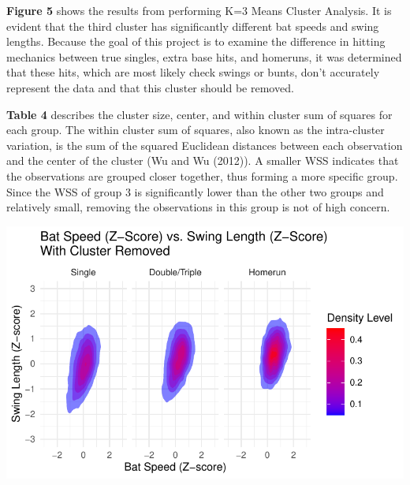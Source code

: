 \documentclass[
  letterpaper,
  DIV=11,
  numbers=noendperiod]{scrartcl}
\begin{document}
\textbf{Figure 5} shows the results from performing K=3 Means Cluster
Analysis. It is evident that the third cluster has significantly
different bat speeds and swing lengths. Because the goal of this project
is to examine the difference in hitting mechanics between true singles,
extra base hits, and homeruns, it was determined that these hits, which
are most likely check swings or bunts, don't accurately represent the
data and that this cluster should be removed.

\textbf{Table 4} describes the cluster size, center, and within cluster
sum of squares for each group. The within cluster sum of squares, also
known as the intra-cluster variation, is the sum of the squared
Euclidean distances between each observation and the center of the
cluster (Wu and Wu (2012)). A smaller WSS indicates that the
observations are grouped closer together, thus forming a more specific
group. Since the WSS of group 3 is significantly lower than the other
two groups and relatively small, removing the observations in this group
is not of high concern.

\includegraphics{README_files/figure-pdf/unnamed-chunk-12-1.pdf}
\end{document}
